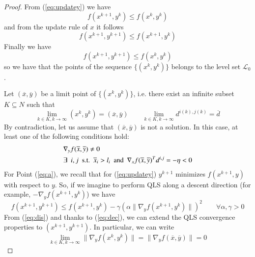 \begin{proof}
From (\ref{eq:updatey}) we have
\begin{equation}
f(x^{k+1}, y^{k}) \leq f(x^{k}, y^{k})
\end{equation}
and from the update rule of $x$ it follows
\begin{equation}\label{eq:dec}
f(x^{k+1}, y^{k+1}) \leq f(x^{k+1}, y^{k})
\end{equation}
Finally we have
\begin{equation}
f(x^{k+1}, y^{k+1}) \leq f(x^{k}, y^{k})
\end{equation}
so we have that the points of the sequence $\{(x^{k}, y^{k})\}$ belongs to the level set $\mathcal{L}_0$.
\vspace{1.5cm}

Let $(\overline{x},\overline{y})$ be a limit point of $\{(x^k, y^k)\}$, i.e. there exist an infinite subset $K \subseteq N$ such that
\begin{equation}\label{eq:asim}
\lim_{k \in K, k \rightarrow \infty} (x^k, y^k) = (\overline{x},\overline{y}) \qquad \lim_{k \in K, k \rightarrow \infty} d^{i(k),j(k)} = \overline{d}
\end{equation}
By contradiction, let us assume that $(\overline{x},\overline{y})$ is not a solution. In this case, at least one of the following conditions hold:
\begin{subequations}
\begin{align}
&\nabla_y f(\overline{x},\overline{y}) \neq 0  \label{eq:a}\\
&\exists \enskip i, j \enskip  \text{s.t.} \enskip \overline{x}_i > l_i \enskip  \text{and} \enskip  \nabla_x f(\overline{x},\overline{y})^T d^{i,j} = -\eta < 0 \label{eq:b}
\end{align}
\end{subequations}
For Point (\ref{eq:a}), we recall that for (\ref{eq:updatey}) $y^{k+1}$ minimizes $f(x^{k+1},y)$ with respect to $y$. So, if we imagine to perform QLS along a descent direction (for example, $-\nabla_y f(x^{k+1},y^{k})$) we have
\begin{equation}\label{eq:dis}
f(x^{k+1}, y^{k+1}) \leq f(x^{k+1}, y^{k}) - \gamma (\alpha \parallel \nabla_y f(x^{k+1}, y^{k}) \parallel) ^2 \qquad \forall \alpha, \gamma > 0
\end{equation}
From (\ref{eq:dis}) and thanks to (\ref{eq:dec}), we can extend the QLS convergence properties to $(x^{k+1}, y^{k+1})$. In particular, we can write
\begin{equation}
\lim_{k \in K, k \rightarrow \infty} \parallel \nabla_y f(x^{k}, y^{k}) \parallel =  \parallel \nabla_y f(\overline{x},\overline{y}) \parallel = 0

\end{equation}
\end{proof}
